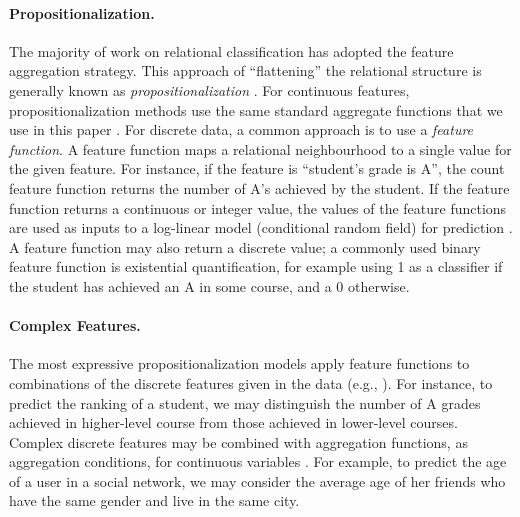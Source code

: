 \documentclass[oribibl]{llncs}%
\begin{document}
\paragraph{Propositionalization.} The majority of work on relational classification has adopted the feature aggregation strategy. 
This approach of ``flattening'' the relational structure is generally known as {\em propositionalization} \cite{Kramer2000}. %
%
For continuous features, propositionalization methods use the same standard aggregate functions that we use in this paper \cite{Krogel2002,C.Vens2004}. For discrete data, a common approach is to use a {\em feature function}. A feature function maps a relational neighbourhood to a single value for the given feature. For instance, if the feature is ``student's grade is A'', the count feature function returns the number of A's achieved by the student. If the feature function returns a continuous or integer value, the values of the feature functions are used as inputs to a log-linear model (conditional random field) for prediction \cite{Sutton2007,Taskar2002,Domingos2009,Lu2003}. A feature function may also return a discrete value; a commonly used binary feature function is existential quantification, for example using 1 as a classifier if the student has achieved an A in some course, and a 0 otherwise.

\paragraph{Complex Features.} The most expressive propositionalization models apply feature functions to combinations of the discrete features given in the data (e.g., \cite{Kuzelka2011}). For instance, to predict the ranking of a student, we may distinguish the number of A grades achieved in higher-level course from those achieved in lower-level courses. Complex discrete features may be combined with aggregation functions, as aggregation conditions, for continuous variables  \cite{C.Vens2004,Popescul2007}. For example, to predict the age of a user in a social network, we may consider the average age of her friends who have the same gender and live in the same city.
\end{document}
